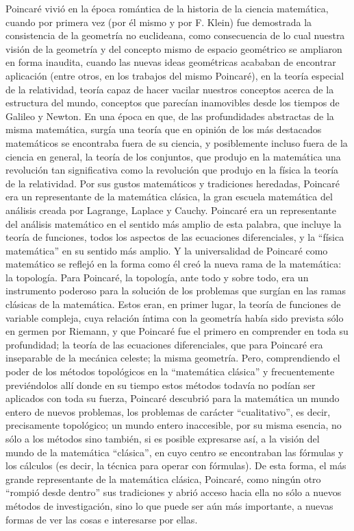 \documentclass[a4paper, 12pt]{article}
\begin{document}
Poincaré vivió en la época romántica de la historia de la ciencia matemática, cuando por primera vez
(por él mismo y por F. Klein) fue demostrada la consistencia de la geometría no euclideana, como consecuencia de lo cual nuestra visión de la geometría y del 
concepto mismo de espacio geométrico se ampliaron en 
forma inaudita, cuando las nuevas ideas geométricas acababan de encontrar aplicación (entre otros, en los trabajos del mismo Poincaré), en la teoría especial de la relatividad, teoría capaz de hacer vacilar nuestros conceptos acerca de la estructura del mundo, conceptos que parecían inamovibles desde los tiempos de
Galileo y Newton. En una época en que, de las profundidades abstractas de la misma matemática, surgía una teoría que en opinión de los más destacados matemáticos se encontraba fuera de su ciencia, y posiblemente incluso fuera de la ciencia en general, la teoría de
los conjuntos, que produjo en la matemática una revolución tan significativa como la revolución que produjo en la física la teoría de la relatividad. Por sus gustos matemáticos y tradiciones heredadas, Poincaré era un representante de la matemática clásica, la gran escuela matemática del análisis creada por Lagrange, Laplace y Cauchy. Poincaré era un representante del análisis matemático en el sentido más amplio de esta palabra, que incluye la teoría de funciones, todos los aspectos de las ecuaciones diferenciales, y la ``física matemática'' en su sentido más amplio. Y la universalidad de Poincaré como matemático se reflejó en la forma como él creó la nueva rama de la matemática: la topología. Para Poincaré, la topología, ante todo y sobre todo, era un instrumento poderoso para la solución de los problemas que surgían en las ramas clásicas de la matemática. Estos eran, en primer lugar, la teoría de funciones de variable compleja, cuya relación  íntima con la geometría había sido prevista sólo en  germen por Riemann, y que Poincaré fue el primero en
comprender en toda su profundidad; la teoría de las  ecuaciones diferenciales, que para Poincaré era inseparable de la mecánica celeste; la misma geometría.  Pero, comprendiendo el poder de los métodos topológicos en la ``matemática clásica'' y frecuentemente previéndolos allí donde en su tiempo estos métodos todavía no podían ser aplicados con toda su fuerza, Poincaré descubrió para la matemática un mundo entero de nuevos problemas, los problemas de carácter ``cualitativo'', es decir, precisamente topológico; un mundo entero inaccesible, por su misma esencia, no sólo a los métodos sino también, si es posible expresarse así, a la visión del mundo de la matemática ``clásica'', en cuyo centro se encontraban las fórmulas y los cálculos (es decir, la técnica para operar con fórmulas). De  esta forma, el más grande representante de la matemática clásica, Poincaré, como ningún otro ``rompió desde dentro'' sus tradiciones y abrió acceso hacia ella no sólo a nuevos métodos de investigación, sino lo  que puede ser aún más importante, a nuevas formas de ver las cosas e interesarse por ellas.
\end{document}
